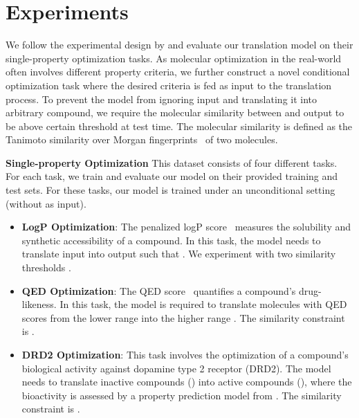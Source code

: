 \documentclass{article} \usepackage{iclr2020_conference,times}
\begin{document}
 \section{Experiments}
\label{sec:experiment}
\newcommand\Tstrut{\rule{0pt}{2.3ex}}
\newcommand\Bstrut{\rule[-0.9ex]{0pt}{0pt}}

We follow the experimental design by \citet{jin2018learning} and evaluate our translation model on their single-property optimization tasks.
As molecular optimization in the real-world often involves different property criteria, we further construct a novel conditional optimization task where the desired criteria is fed as input to the translation process.
To prevent the model from ignoring input  and translating it into arbitrary compound, we require the molecular similarity between  and output  to be above certain threshold  at test time. The molecular similarity is defined as the Tanimoto similarity over Morgan fingerprints~\citep{rogers2010extended} of two molecules.

\textbf{Single-property Optimization } This dataset consists of four different tasks. For each task, we train and evaluate our model on their provided training and test sets. For these tasks, our model is trained under an unconditional setting (without  as input).  

\begin{itemize}[leftmargin=*,topsep=0pt,itemsep=0pt] 
\item \textbf{LogP Optimization}: The penalized logP score~\citep{kusner2017grammar} measures the solubility and synthetic accessibility of a compound. In this task, the model needs to translate input  into output  such that . We experiment with two similarity thresholds .

\item \textbf{QED Optimization}: The QED score~\citep{bickerton2012quantifying} quantifies a compound's drug-likeness. In this task, the model is required to translate molecules with QED scores from the lower range  into the higher range . The similarity constraint is .

\item \textbf{DRD2 Optimization}: This task involves the optimization of a compound's biological activity against dopamine type 2 receptor (DRD2). The model needs to translate inactive compounds () into active compounds (), where the bioactivity is assessed by a property prediction model from \citet{olivecrona2017molecular}. The similarity constraint is .
\end{itemize}
\end{document}
